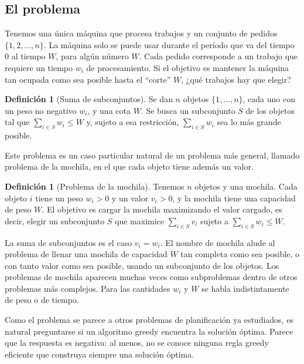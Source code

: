 \documentclass[12pt, spanish, oneside, openany]{book}
\theoremstyle{uprightplain}
\theoremstyle{definition}
\newtheorem{definicion}[teorema]{Definición}
\theoremstyle{remark}
\theoremstyle{definition}
\begin{document}
\subsection{El problema}

Tenemos una única máquina que procesa trabajos y un conjunto de pedidos $\{1,2,\dots,n\}$. La máquina solo se puede usar durante el período que va del tiempo $0$ al tiempo $W$, para algún número $W$. Cada pedido corresponde a un trabajo que requiere un tiempo $w_i$ de procesamiento. Si el objetivo es mantener la máquina tan ocupada como sea posible hasta el ``corte'' $W$, ¿qué trabajos hay que elegir?

\begin{definicion}[Suma de subconjuntos]
\label{def:dp-subset-sum}
Se dan $n$ objetos $\{1,\dots,n\}$, cada uno con un peso no negativo $w_i$, y una cota $W$. Se busca un subconjunto $S$ de los objetos tal que $\sum_{i\in S} w_i\le W$ y, sujeto a esa restricción, $\sum_{i\in S} w_i$ sea lo más grande posible.
\end{definicion}

Este problema es un caso particular natural de un problema más general, llamado problema de la mochila, en el que cada objeto tiene además un valor.

\begin{definicion}[Problema de la mochila]
\label{def:dp-mochila}
Tenemos $n$ objetos y una mochila. Cada objeto $i$ tiene un peso $w_i>0$ y un valor $v_i>0$, y la mochila tiene una capacidad de peso $W$. El objetivo es cargar la mochila maximizando el valor cargado, es decir, elegir un subconjunto $S$ que maximice $\sum_{i\in S}v_i$ sujeto a $\sum_{i\in S}w_i\le W$.
\end{definicion}

La suma de subconjuntos es el caso $v_i=w_i$. El nombre de mochila alude al problema de llenar una mochila de capacidad $W$ tan completa como sea posible, o con tanto valor como sea posible, usando un subconjunto de los objetos. Los problemas de mochila aparecen muchas veces como subproblemas dentro de otros problemas más complejos. Para las cantidades $w_i$ y $W$ se habla indistintamente de peso o de tiempo.

Como el problema se parece a otros problemas de planificación ya estudiados, es natural preguntarse si un algoritmo greedy encuentra la solución óptima. Parece que la respuesta es negativa: al menos, no se conoce ninguna regla greedy eficiente que construya siempre una solución óptima.
\end{document}
